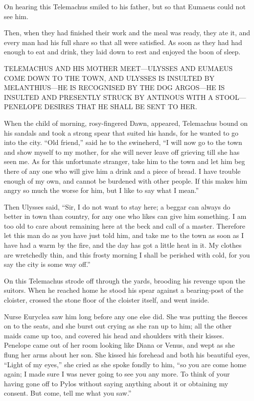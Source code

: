 On hearing this Telemachus smiled to his father, but so that Eumaeus could not
see him.

Then, when they had finished their work and the meal was ready, they ate it,
and every man had his full share so that all were satisfied. As soon as they
had had enough to eat and drink, they laid down to rest and enjoyed the boon of
sleep.


TELEMACHUS AND HIS MOTHER MEET—ULYSSES AND EUMAEUS COME DOWN TO THE TOWN, AND
ULYSSES IS INSULTED BY MELANTHIUS—HE IS RECOGNISED BY THE DOG ARGOS—HE IS
INSULTED AND PRESENTLY STRUCK BY ANTINOUS WITH A STOOL—PENELOPE DESIRES THAT HE
SHALL BE SENT TO HER.

When the child of morning, rosy-fingered Dawn, appeared, Telemachus bound on
his sandals and took a strong spear that suited his hands, for he wanted to go
into the city. “Old friend,” said he to the swineherd, “I will now go to the
town and show myself to my mother, for she will never leave off grieving till
she has seen me. As for this unfortunate stranger, take him to the town and let
him beg there of any one who will give him a drink and a piece of bread. I have
trouble enough of my own, and cannot be burdened with other people. If this
makes him angry so much the worse for him, but I like to say what I mean.”

Then Ulysses said, “Sir, I do not want to stay here; a beggar can always do
better in town than country, for any one who likes can give him something. I am
too old to care about remaining here at the beck and call of a master.
Therefore let this man do as you have just told him, and take me to the town as
soon as I have had a warm by the fire, and the day has got a little heat in it.
My clothes are wretchedly thin, and this frosty morning I shall be perished
with cold, for you say the city is some way off.”

On this Telemachus strode off through the yards, brooding his revenge upon the
suitors. When he reached home he stood his spear against a bearing-post of the
cloister, crossed the stone floor of the cloister itself, and went inside.

Nurse Euryclea saw him long before any one else did. She was putting the
fleeces on to the seats, and she burst out crying as she ran up to him; all the
other maids came up too, and covered his head and shoulders with their kisses.
Penelope came out of her room looking like Diana or Venus, and wept as she
flung her arms about her son. She kissed his forehead and both his beautiful
eyes, “Light of my eyes,” she cried as she spoke fondly to him, “so you are
come home again; I made sure I was never going to see you any more. To think of
your having gone off to Pylos without saying anything about it or obtaining my
consent. But come, tell me what you saw.”


